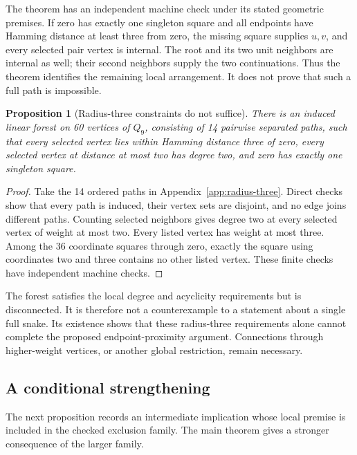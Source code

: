 \documentclass[11pt,a4paper]{article}
\newtheorem{proposition}[theorem]{Proposition}
\theoremstyle{definition}
\theoremstyle{remark}
\newcommand{\Q}{Q}
\begin{document}
The theorem has an independent machine check under its stated geometric premises. If zero has exactly one singleton square and all endpoints have Hamming distance at least three from zero, the missing square supplies $u,v$, and every selected pair vertex is internal. The root and its two unit neighbors are internal as well; their second neighbors supply the two continuations. Thus the theorem identifies the remaining local arrangement. It does not prove that such a full path is impossible.

\begin{proposition}[Radius-three constraints do not suffice]\label{prop:radius-three}
There is an induced linear forest on 60 vertices of $\Q_9$, consisting of 14 pairwise separated paths, such that every selected vertex lies within Hamming distance three of zero, every selected vertex at distance at most two has degree two, and zero has exactly one singleton square.
\end{proposition}
\begin{proof}
Take the 14 ordered paths in Appendix~\ref{app:radius-three}. Direct checks show that every path is induced, their vertex sets are disjoint, and no edge joins different paths. Counting selected neighbors gives degree two at every selected vertex of weight at most two. Every listed vertex has weight at most three. Among the 36 coordinate squares through zero, exactly the square using coordinates two and three contains no other listed vertex. These finite checks have independent machine checks.
\end{proof}

The forest satisfies the local degree and acyclicity requirements but is disconnected. It is therefore not a counterexample to a statement about a single full snake. Its existence shows that these radius-three requirements alone cannot complete the proposed endpoint-proximity argument. Connections through higher-weight vertices, or another global restriction, remain necessary.

\subsection{A conditional strengthening}
The next proposition records an intermediate implication whose local premise is included in the checked exclusion family. The main theorem gives a stronger consequence of the larger family.
\end{document}
